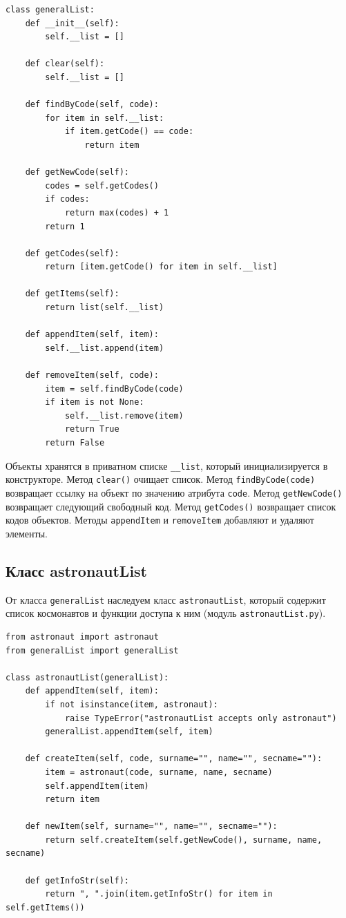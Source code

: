 \documentclass[a4paper,14pt]{extarticle}
\begin{document}
\begin{lstlisting}[caption={Модуль \texttt{generalList.py}}]
class generalList:
    def __init__(self):
        self.__list = []

    def clear(self):
        self.__list = []

    def findByCode(self, code):
        for item in self.__list:
            if item.getCode() == code:
                return item

    def getNewCode(self):
        codes = self.getCodes()
        if codes:
            return max(codes) + 1
        return 1

    def getCodes(self):
        return [item.getCode() for item in self.__list]

    def getItems(self):
        return list(self.__list)

    def appendItem(self, item):
        self.__list.append(item)

    def removeItem(self, code):
        item = self.findByCode(code)
        if item is not None:
            self.__list.remove(item)
            return True
        return False
\end{lstlisting}

Объекты хранятся в приватном списке \texttt{\_\_list}, который инициализируется в конструкторе. Метод \texttt{clear()} очищает список. Метод \texttt{findByCode(code)} возвращает ссылку на объект по значению атрибута \texttt{code}. Метод \texttt{getNewCode()} возвращает следующий свободный код. Метод \texttt{getCodes()} возвращает список кодов объектов. Методы \texttt{appendItem} и \texttt{removeItem} добавляют и удаляют элементы.

\subsection{Класс astronautList}

От класса \texttt{generalList} наследуем класс \texttt{astronautList}, который содержит список космонавтов и функции доступа к ним (модуль \texttt{astronautList.py}).

\begin{lstlisting}[caption={Модуль \texttt{astronautList.py}}]
from astronaut import astronaut
from generalList import generalList

class astronautList(generalList):
    def appendItem(self, item):
        if not isinstance(item, astronaut):
            raise TypeError("astronautList accepts only astronaut")
        generalList.appendItem(self, item)

    def createItem(self, code, surname="", name="", secname=""):
        item = astronaut(code, surname, name, secname)
        self.appendItem(item)
        return item

    def newItem(self, surname="", name="", secname=""):
        return self.createItem(self.getNewCode(), surname, name, secname)

    def getInfoStr(self):
        return ", ".join(item.getInfoStr() for item in self.getItems())
\end{lstlisting}
\end{document}
